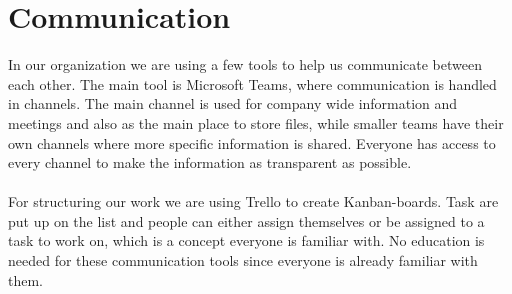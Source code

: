 \section{Communication}
\label{sec:communication}

In our organization we are using a few tools to help us communicate between each other. The main tool is Microsoft Teams, where communication is handled in channels. The main channel is used for company wide information and meetings and also as the main place to store files, while smaller teams have their own channels where more specific information is shared. Everyone has access to every channel to make the information as transparent as possible.
\\ \\
\noindent
For structuring our work we are using Trello to create Kanban-boards. Task are put up on the list and people can either assign themselves or be assigned to a task to work on, which is a concept everyone is familiar with. No education is needed for these communication tools since everyone is already familiar with them.